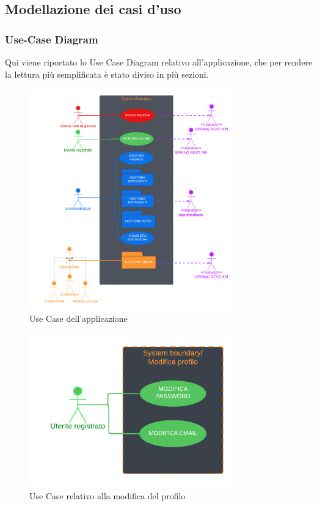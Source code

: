 \subsection{Modellazione dei casi d'uso}
    \subsubsection{Use-Case Diagram}
        \begin{flushleft}
            Qui viene riportato lo Use Case Diagram relativo all'applicazione, che per rendere la lettura più semplificata 
            è stato diviso in più sezioni.
        \end{flushleft}
        
        \begin{figure}[H]
            \centering
            \includegraphics[width=0.8\textwidth]{assets/diagrammi/Use-Case/Use-Case Generale.png}
            \caption{Use Case dell'applicazione}
            \label{fig:ucdGenerale}
        \end{figure}
        
        \begin{figure}[H]
            \centering
            \includegraphics[width=0.8\textwidth]{assets/diagrammi/Use-Case/Modifica Profilo.png}
            \caption{Use Case relativo alla modifica del profilo}
            \label{fig:ucdModProfile}
        \end{figure}

